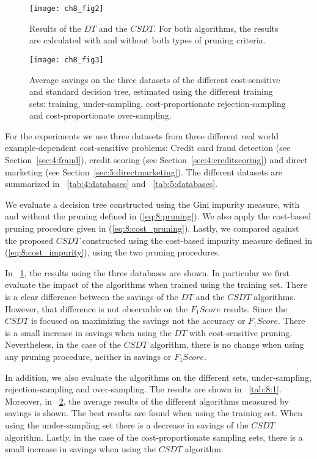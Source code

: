 \begin{figure}[t]
  \centering
  \texttt{[image: ch8\_fig2]}
  \caption{Results of the $DT$ and the $CSDT$. For both algorithms, the results are 
  calculated with and without both types of pruning  criteria.}
\label{fig:8:2}
\end{figure}
\begin{figure}[t]
  \centering
  \texttt{[image: ch8\_fig3]}
  \caption{Average savings on the three datasets of the different cost-sensitive and standard 
  decision tree,  estimated using the different training sets: training, under-sampling, 
  cost-proportionate rejection-sampling  and cost-proportionate over-sampling.}
  \label{fig:8:3}
\end{figure}

For the experiments we use three datasets from three different real world example-dependent 
cost-sensitive problems: Credit card fraud detection (see Section~\ref{sec:4:fraud}), credit 
scoring (see Section~\ref{sec:4:creditscoring}) and direct marketing (see 
Section~\ref{sec:5:directmarketing}). The different datasets are summarized 
in \tablename{~\ref{tab:4:databases}} and \tablename{~\ref{tab:5:databases}}.

We evaluate a decision tree constructed using the Gini impurity measure, with and without the 
pruning defined in (\ref{eq:8:pruning}). We also apply    the cost-based pruning procedure given 
in (\ref{eq:8:cost_pruning}). Lastly, we compared against     the proposed $CSDT$ constructed 
using the cost-based impurity measure defined in (\ref{eq:8:cost_impurity}), using the two 
pruning procedures.

In \figurename{~\ref{fig:8:2}}, the results using the three databases are shown. In particular we 
first evaluate the impact of the algorithms when trained using the training set. There is a clear 
difference between the savings of the $DT$ and the $CSDT$ algorithms. However, that difference 
is not observable on the $F_1Score$ results. Since the $CSDT$ is focused on maximizing the 
savings not the accuracy or $F_1Score$. There is a small increase in savings when using the 
$DT$ with cost-sensitive pruning. Nevertheless, in the case of the $CSDT$ algorithm, there is 
no change when using any pruning procedure, neither in savings or $F_1Score$.

In addition, we also evaluate the algorithms on the different sets, under-sampling, 
rejection-sampling and over-sampling. The results are shown in \tablename{~\ref{tab:8:1}}. 
Moreover, in \figurename{~\ref{fig:8:3}}, the average results of the different algorithms measured 
by savings is shown. The best results are found when using the training set. When using the 
under-sampling set there is a decrease in savings of the $CSDT$ algorithm. Lastly, in the case of 
the cost-proportionate sampling sets, there is a small increase in savings when using the $CSDT$ 
algorithm. 
 

